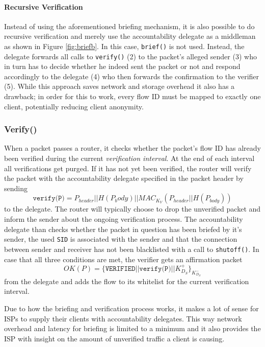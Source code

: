 \documentclass{acm_proc_article-sp}
\begin{document}
\paragraph{Recursive Verification}
Instead of using the aforementioned briefing mechanism, it is also possible to do recursive verification and merely use the accountability delegate as a middleman as shown in Figure \ref{fig:briefb}. In this case, \texttt{brief()} is not used. Instead, the delegate forwards all calls to \texttt{verify()} (2) to the packet's alleged sender (3) who in turn has to decide whether he indeed sent the packet or not and respond accordingly to the delegate (4) who then forwards the confirmation to the verifier (5). While this approach saves network and storage overhead it also has a drawback; in order for this to work, every flow ID must be mapped to exactly one client, potentially reducing client anonymity.

\subsubsection{Verify()}
When a packet passes a router, it checks whether the packet's flow ID has already been verified during the current \emph{verification interval}. At the end of each interval all verifications get purged. If it has not yet been verified, the router will verify the packet with the accountability delegate specified in the packet header by sending 
\begin{equation}
\texttt{verify(P)} = P_{header} || H(P_body) || MAC_{K_V}(P_{header} || H(P_{body}))
\end{equation}
to the delegate. The router will typically choose to drop the unverified packet and inform the sender about the ongoing verification process. The accountability delegate than checks whether the packet in question has been briefed by it's sender, the used \texttt{SID} is associated with the sender and that the connection between sender and receiver has not been blacklisted with a call to \texttt{shutoff()}. In case that all three conditions are met, the verifier gets an affirmation packet 
\begin{equation}
OK(P) = \{\texttt{VERIFIED} || \texttt{verify(P)} || K^+_{D_S}\}_{K^-_{D_S}}
\end{equation}
from the delegate and adds the flow to its whitelist for the current verification interval.

Due to how the briefing and verification process works, it makes a lot of sense for ISPs to supply their clients with accountability delegates. This way network overhead and latency for briefing is limited to a minimum and it also provides the ISP with insight on the amount of unverified traffic a client is causing.
\end{document}
